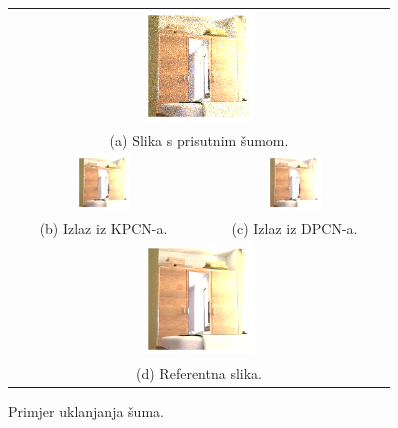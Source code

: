 \documentclass[times, utf8, seminar, numeric]{fer}
\begin{document}
\begin{figure}[H]
  \centering
\begin{tabular}{cc}
  \multicolumn{2}{c}{\includegraphics[width=0.3\textwidth]{eval2_in.png}} \\
  \multicolumn{2}{c}{(a) Slika s prisutnim šumom.} \\[6pt]
  \includegraphics[width=0.3\textwidth]{eval2_kpcn.png} & \includegraphics[width=0.3\textwidth]{eval2_dpcn.png} \\
  (b) Izlaz iz KPCN-a. & (c) Izlaz iz DPCN-a. \\[6pt]
  \multicolumn{2}{c}{\includegraphics[width=0.3\textwidth]{eval2_ref.png}} \\
  \multicolumn{2}{c}{(d) Referentna slika.} \\[6pt]
\end{tabular}
\caption{Primjer uklanjanja šuma.}
\label{fig:eval2}
\end{figure}
\end{document}
